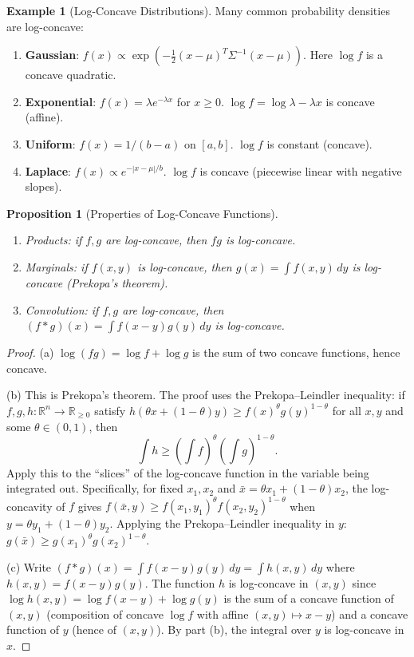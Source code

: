\documentclass[11pt,a4paper]{article}
\newtheorem{proposition}[theorem]{Proposition}
\theoremstyle{definition}
\newtheorem{example}[theorem]{Example}
\theoremstyle{remark}
\newcommand{\R}{\mathbb{R}}
\begin{document}
\begin{example}[Log-Concave Distributions]
\label{ex:log-concave-dist}
Many common probability densities are log-concave:
\begin{enumerate}[label=(\alph*)]
  \item \textbf{Gaussian}: $f(x) \propto \exp(-\tfrac{1}{2}(x-\mu)^T \Sigma^{-1}
        (x-\mu))$. Here $\log f$ is a concave quadratic.
  \item \textbf{Exponential}: $f(x) = \lambda e^{-\lambda x}$ for $x \ge 0$.
        $\log f = \log \lambda - \lambda x$ is concave (affine).
  \item \textbf{Uniform}: $f(x) = 1/(b-a)$ on $[a,b]$. $\log f$ is constant (concave).
  \item \textbf{Laplace}: $f(x) \propto e^{-|x-\mu|/b}$. $\log f$ is concave (piecewise
        linear with negative slopes).
\end{enumerate}
\end{example}

\begin{proposition}[Properties of Log-Concave Functions]
\label{prop:log-concave-properties}
\begin{enumerate}[label=(\alph*)]
  \item Products: if $f, g$ are log-concave, then $fg$ is log-concave.
  \item Marginals: if $f(x, y)$ is log-concave, then $g(x) = \int f(x, y) \, dy$ is
        log-concave (Prekopa's theorem).
  \item Convolution: if $f, g$ are log-concave, then $(f * g)(x) = \int f(x-y) g(y) \,
        dy$ is log-concave.
\end{enumerate}
\end{proposition}

\begin{proof}
(a) $\log(fg) = \log f + \log g$ is the sum of two concave functions, hence concave.

(b) This is Prekopa's theorem. The proof uses the Prekopa--Leindler inequality: if $f, g,
h : \R^n \to \R_{\ge 0}$ satisfy $h(\theta x + (1-\theta)y) \ge f(x)^\theta
g(y)^{1-\theta}$ for all $x, y$ and some $\theta \in (0,1)$, then
\[
  \int h \ge \left(\int f\right)^\theta \left(\int g\right)^{1-\theta}.
\]
Apply this to the ``slices'' of the log-concave function in the variable being
integrated out. Specifically, for fixed $x_1, x_2$ and $\bar{x} = \theta x_1 +
(1-\theta) x_2$, the log-concavity of $f$ gives
$f(\bar{x}, y) \ge f(x_1, y_1)^\theta f(x_2, y_2)^{1-\theta}$ when
$y = \theta y_1 + (1-\theta) y_2$. Applying the Prekopa--Leindler inequality in $y$:
$g(\bar{x}) \ge g(x_1)^\theta g(x_2)^{1-\theta}$.

(c) Write $(f * g)(x) = \int f(x - y) g(y) \, dy = \int h(x, y) \, dy$ where
$h(x, y) = f(x - y) g(y)$. The function $h$ is log-concave in $(x, y)$ since
$\log h(x,y) = \log f(x-y) + \log g(y)$ is the sum of a concave function of $(x,y)$
(composition of concave $\log f$ with affine $(x,y) \mapsto x - y$) and a concave
function of $y$ (hence of $(x,y)$). By part (b), the integral over $y$ is log-concave
in $x$.
\end{proof}
\end{document}
